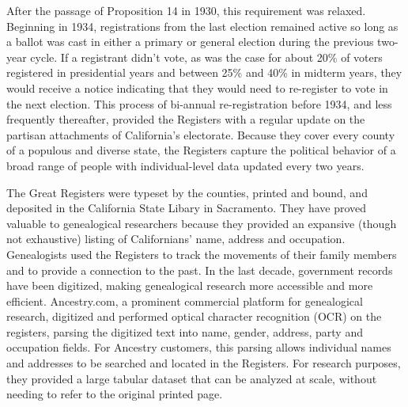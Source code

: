 \documentclass[11pt]{scrartcl}\usepackage[]{graphicx}\usepackage[]{color}
\begin{document}
After the passage of Proposition 14 in 1930, this requirement was relaxed. Beginning in 1934, registrations from the last election remained active so long as a ballot was cast in either a primary or general election during the previous two-year cycle. If a registrant didn't vote, as was the case for about 20\% of voters registered in presidential years and between 25\% and 40\% in midterm years, they would receive a notice indicating that they would need to re-register to vote in the next election.  This process of bi-annual re-registration before 1934, and less frequently thereafter, provided the Registers with a regular update on the partisan attachments of California's electorate. Because they cover every county of a populous and diverse state, the Registers capture the political behavior of a broad range of people with individual-level data updated every two years.

The Great Registers were typeset by the counties, printed and bound, and deposited in the California State Libary in Sacramento. They have proved valuable to genealogical researchers because they provided an expansive (though not exhaustive) listing of Californians' name, address and occupation. Genealogists used the Registers to track the movements of their family members and to provide a connection to the past.  In the last decade, government records have been digitized, making genealogical research more accessible and more efficient.  Ancestry.com, a prominent commercial platform for genealogical research, digitized and performed optical character recognition (OCR) on the registers, parsing the digitized text into name, gender, address, party and occupation fields. For Ancestry customers, this parsing allows individual names and addresses to be searched and located in the Registers.  For research purposes, they provided a large tabular dataset that can be analyzed at scale, without needing to refer to the original printed page.  

\end{document}

